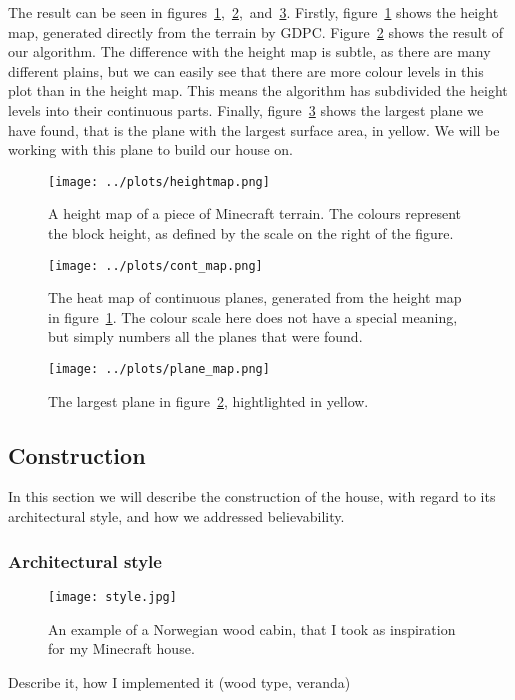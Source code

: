 \documentclass[10pt]{article}
\begin{document}
The result can be seen in figures~\ref{fig:heightmap},~\ref{fig:cont_map},~and~\ref{fig:plane_map}. Firstly, figure~\ref{fig:heightmap} shows the height map, generated directly from the terrain by GDPC. Figure~\ref{fig:cont_map} shows the result of our algorithm. The difference with the height map is subtle, as there are many different plains, but we can easily see that there are more colour levels in this plot than in the height map. This means the algorithm has subdivided the height levels into their continuous parts. Finally, figure~\ref{fig:plane_map} shows the largest plane we have found, that is the plane with the largest surface area, in yellow. We will be working with this plane to build our house on.

\begin{figure}
    \texttt{[image: ../plots/heightmap.png]}
    \centering
    \caption{A height map of a piece of Minecraft terrain. The colours represent the block height, as defined by the scale on the right of the figure.}
    \label{fig:heightmap}
\end{figure}
\begin{figure}
    \texttt{[image: ../plots/cont\_map.png]}
    \centering
	\caption{The heat map of continuous planes, generated from the height map in figure~\ref{fig:heightmap}. The colour scale here does not have a special meaning, but simply numbers all the planes that were found.}
    \label{fig:cont_map}
\end{figure}
\begin{figure}
    \texttt{[image: ../plots/plane\_map.png]}
    \centering
	\caption{The largest plane in figure~\ref{fig:cont_map}, hightlighted in yellow.}
    \label{fig:plane_map}
\end{figure}

\subsection{Construction}
In this section we will describe the construction of the house, with regard to its architectural style, and how we addressed believability.
\subsubsection{Architectural style}

\begin{figure}
    \texttt{[image: style.jpg]}
    \centering
	\caption{An example of a Norwegian wood cabin, that I took as inspiration for my Minecraft house.}
    \label{fig:style}
\end{figure}
Describe it, how I implemented it (wood type, veranda)
\end{document}
